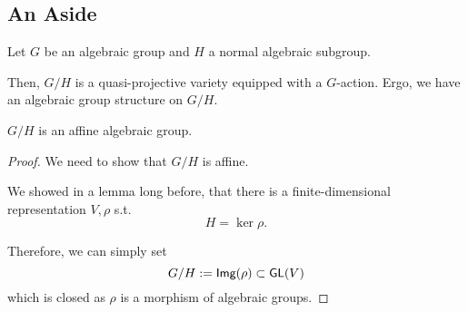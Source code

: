 \subsection{An Aside}
Let $G$ be an algebraic group and $H$ a normal algebraic subgroup.

Then, $G/H$ is a quasi-projective variety equipped with a $G$-action. Ergo, we have an algebraic group structure on $G/H$.

\begin{theorem}
	$G/H$ is an affine algebraic group.
\end{theorem}
\begin{proof}
	We need to show that $G/H$ is affine.
	
	We showed in a lemma long before, that there is a finite-dimensional representation $V,\rho$ s.t.
	\[ H = \ker \rho. \]
	
	Therefore, we can simply set
	\[ G/H := \textsf{Img} (\rho) \subset \textsf{GL}(V) \]
	which is closed as $\rho$ is a morphism of algebraic groups.
\end{proof}

